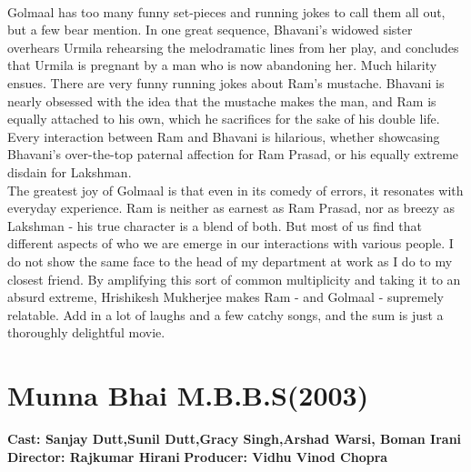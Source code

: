 \documentclass{article}
\begin{document}
\\
Golmaal has too many funny set-pieces and running jokes to call them all out, but a few bear mention.  In one great sequence, Bhavani's widowed sister overhears Urmila rehearsing the melodramatic lines from her play, and concludes that Urmila is pregnant by a man who is now abandoning her.  Much hilarity ensues.  There are very funny running jokes about Ram's mustache.  Bhavani is nearly obsessed with the idea that the mustache makes the man, and Ram is equally attached to his own, which he sacrifices for the sake of his double life.  Every interaction between Ram and Bhavani is hilarious, whether showcasing Bhavani's over-the-top paternal affection for Ram Prasad, or his equally extreme disdain for Lakshman. 
\\
The greatest joy of Golmaal is that even in its comedy of errors, it resonates with everyday experience.  Ram is neither as earnest as Ram Prasad, nor as breezy as Lakshman - his true character is a blend of both.  But most of us find that different aspects of who we are emerge in our interactions with various people.  I do not show the same face to the head of my department at work as I do to my closest friend.  By amplifying this sort of common multiplicity and taking it to an absurd extreme, Hrishikesh Mukherjee makes Ram - and Golmaal - supremely relatable.  Add in a lot of laughs and a few catchy songs, and the sum is just a thoroughly delightful movie. 


\section{Munna Bhai M.B.B.S(2003)}

\textbf{Cast: Sanjay Dutt,Sunil Dutt,Gracy Singh,Arshad Warsi, Boman Irani}
\textbf{Director: Rajkumar Hirani }  
\textbf{Producer: Vidhu Vinod Chopra }
\end{document}
